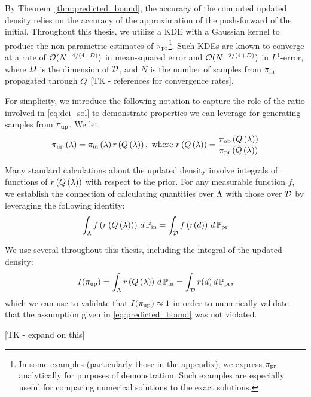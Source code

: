 By Theorem~\ref{thm:predicted_bound}, the accuracy of the computed updated density relies on the accuracy of the approximation of the push-forward of the initial.
Throughout this thesis, we utilize a KDE with a Gaussian kernel to produce the non-parametric estimates of $\operatorname*{\pi_{pr}}$\footnote{
In some examples (particularly those in the appendix), we express $\operatorname*{\pi_{pr}}$ analytically for purposes of demonstration.
Such examples are especially useful for comparing numerical solutions to the exact solutions.
}.
Such KDEs are known to converge at a rate of $\mathcal{O}(N^{-4/(4+D)})$ in mean-squared error and $\mathcal{O}(N^{-2/(4+D)})$ in $L^1$-error, where $D$ is the dimension of $\mathcal{D}$, and $N$ is the number of samples from $\operatorname*{\pi_{in}}$ propagated through $Q$ [TK - references for convergence rates].

For simplicity, we introduce the following notation to capture the role of the ratio involved in \eqref{eq:dci_sol} to demonstrate properties we can leverage for generating samples from $\operatorname*{\pi_{up}}$.
We let
\[
\operatorname*{\pi_{up}}\left ( \lambda \right ) = \operatorname*{\pi_{in}} \left ( \lambda \right ) r\left ( Q\left ( \lambda \right ) \right ), \text{ where } r\left ( Q\left ( \lambda \right ) \right ) = \frac{\operatorname*{\pi_{ob}}\left ( Q\left ( \lambda \right ) \right )}{\operatorname*{\pi_{pr}}\left ( Q\left ( \lambda \right ) \right )}
\]

Many standard calculations about the updated density involve integrals of functions of $r\left ( Q\left ( \lambda \right ) \right )$ with respect to the prior.
For any measurable function $f$, we establish the connection of calculating quantities over ${\Lambda}$ with those over $\mathcal{D}$ by leveraging the following identity:
\[
\int_{\Lambda} f\left( r\left ( Q\left ( \lambda \right ) \right ) \right ) \, d\operatorname*{\mathbb{P}_{in}} = \int_{\mathcal{D}} f\left( r(d) \right ) \, d\operatorname*{\mathbb{P}_{pr}}
\]

We use several throughout this thesis, including the integral of the updated density:
\[
I(\operatorname*{\pi_{up}} ) = \int_{\Lambda} r\left ( Q\left ( \lambda \right ) \right ) \, d\operatorname*{\mathbb{P}_{in}} = \int_{\mathcal{D}} r(d) \, d\operatorname*{\mathbb{P}_{pr}} ,
\]
which we can use to validate that $I(\operatorname*{\pi_{up}}) \approx 1$ in order to numerically validate that the assumption given in \eqref{eq:predicted_bound} was not violated.

[TK - expand on this]


